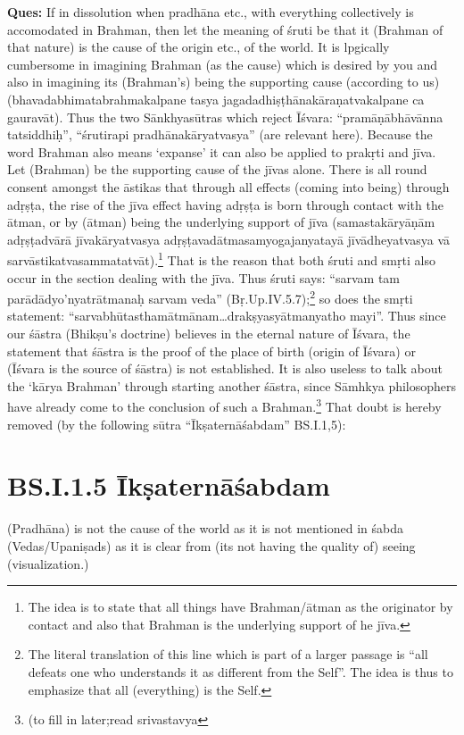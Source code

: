 \textbf{Ques:} If in dissolution when pradhāna etc., with everything collectively is accomodated in Brahman, then let the meaning of śruti be that it (Brahman of that nature) is the cause of the origin etc., of the world. It is lpgically cumbersome in imagining Brahman (as the cause) which is desired by you and also in imagining its (Brahman’s) being the supporting cause (according to us) (bhavadabhimatabrahmakalpane tasya jagadadhiṣṭhānakāraṇatvakalpane ca gauravāt). Thus the two Sānkhyasūtras which reject Īśvara: “pramāṇābhāvānna tatsiddhiḥ”, “śrutirapi pradhānakāryatvasya” (are relevant here). Because the word Brahman also means ‘expanse’ it can also be applied to prakṛti and jīva. Let (Brahman) be the supporting cause of the jīvas alone. There is all round consent amongst the āstikas that through all effects (coming into being) through adṛṣṭa, the rise of the jīva effect  having adṛṣṭa is born through contact with the ātman,  or by (ātman) being the underlying support of jīva  (samastakāryāṇām adṛṣṭadvārā jīvakāryatvasya adṛṣṭavadātmasamyogajanyatayā jīvādheyatvasya vā sarvāstikatvasammatatvāt).\footnote{The idea is to state that all things have Brahman/ātman as the originator by contact and also that Brahman is the underlying support of he jīva.} That is the reason that both śruti and smṛti also occur in the section dealing with the jīva. Thus śruti says: “sarvam tam parādādyo’nyatrātmanaḥ sarvam veda” (Bṛ.Up.IV.5.7);\footnote{The literal translation of this line which is part of a larger passage is “all defeats one who understands it as different from the Self”. The idea is thus to emphasize that all (everything) is the Self.} so does the smṛti statement: “sarvabhūtasthamātmānam…drakṣyasyātmanyatho mayi”. Thus since our śāstra (Bhikṣu’s doctrine) believes in the eternal nature of Īśvara, the statement that śāstra is the proof of the place of birth (origin of Īśvara) or (Īśvara is the source of śāstra) is not established. It is also useless to talk about the ‘kārya Brahman’ through starting another śāstra, since Sāmhkya philosophers have already come to the conclusion of such a Brahman.\footnote{(to fill in later;read srivastavya} That doubt is hereby removed (by the following sūtra “Īkṣaternāśabdam” BS.I.1,5):

\section*{BS.I.1.5 Īkṣaternāśabdam}

(Pradhāna) is not the cause of the world as it is not mentioned in śabda (Vedas/Upaniṣads) as it is clear from (its not having the quality of) seeing (visualization.)

